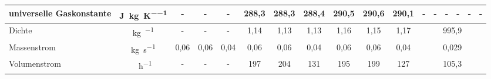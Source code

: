 \begin{landscape}
\begin{table}[h!]
{\begin{tabular}{l|c|c|c|c|c|c|c|c|c|c|c|c|c|c|c|c}
				universelle Gaskonstante & \si{\joule \per \kg \per \kelvin} & -     & -     & -     & 288,3 & 288,3 & 288,4 & 290,5 & 290,6 & 290,1 & -     & -     & -     & -     & -     & - \\
				\hline
				Dichte & \si{\kg\per\kmeter} & -     & -     & -     & \multicolumn{1}{c|}{1,14} & \multicolumn{1}{c|}{1,13} & 1,13  & \multicolumn{1}{c|}{1,16} & \multicolumn{1}{c|}{1,15} & \multicolumn{1}{c|}{1,17} & \multicolumn{6}{c}{995,9} \\
				\hline
				Massenstrom & \si{\kg\per\second}  &    0,06&0,06&0,04 &0,06&0,06&0,04  &0,06&0,06&0,04   & \multicolumn{6}{c}{0,029} \\
				\hline
				Volumenstrom & \si{\kmeter \per \hour} & -     & -     & -     & 197   & 204   & 131   & 195   & 199   & 127   & \multicolumn{6}{c}{105,3} \\
			\end{tabular}
		}
	\end{table}%
	\FloatBarrier
\end{landscape}




